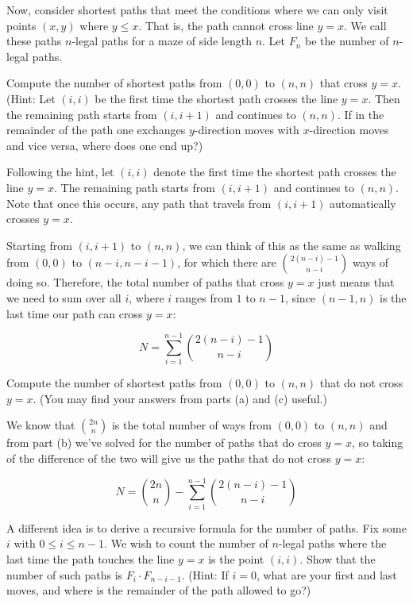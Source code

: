 \documentclass[11pt]{article}
\begin{document}
Now, consider shortest paths that meet the conditions where we can only visit points $(x, y)$ where $y \leq x$. That is, the path cannot cross
line $y = x$. We call these paths $n$-legal paths for a maze of side length $n$. Let $F_n$ be the number of $n$-legal paths.
\begin{ResumeParts}
\Part Compute the number of shortest paths from $(0, 0)$ to $(n, n)$ that cross $y = x$. (Hint: Let $(i, i)$ be the first time the shortest path crosses the line $y = x$. Then the remaining path starts from $(i,i+1)$ and continues to $(n,n)$. If in the remainder of the path 
one exchanges $y$-direction moves with $x$-direction moves and
vice versa, where does one end up?)

\begin{solution}
  Following the hint, let $(i, i)$ denote the first time the shortest path crosses the line $y = x$. The remaining path starts from $(i, i+1)$ and continues to $(n,n)$. Note that once this occurs, any path that travels from $(i, i+1)$ automatically crosses $y = x$. 

  Starting from $(i, i+1)$ to $(n, n)$, we can think of this as the same as walking from $(0, 0)$ to $(n - i, n - i - 1)$, for which there are ${2(n-i) - 1 \choose {n - i}}$ ways of doing so. Therefore, the total number of paths that cross $y = x$ just means that we need to sum over all $i$, where $i$ ranges from $1$ to $n - 1$, since $(n -1, n)$ is the last time our path can cross $y =x$: 

  \[ N = \sum_{i = 1}^{n - 1} {2 (n -i) - 1 \choose {n - i}}\]
\end{solution}

\Part Compute the number of shortest paths from $(0, 0)$ to $(n, n)$ that do not cross $y = x$. (You may find your answers from parts (a) and (c) useful.)

\begin{solution}
  We know that $2n \choose n$ is the total number of ways from $(0, 0)$ to $(n, n)$ and from part (b) we've solved for the number of paths that do cross $y = x$, so taking of the difference of the two will give us the paths that do not cross $y = x$: 

  \[ N = {2n \choose n} - \sum_{i = 1}^{n - 1} {2 (n -i) - 1 \choose {n - i}}\]
\end{solution}

\Part A different idea is to derive a recursive formula for the number of paths. Fix some $i$ with $0 \leq i \leq n - 1$. We wish to count the number of $n$-legal paths where the last time the path touches the line $y = x$ is the point $(i, i)$. Show that the number of such paths is $F_i \cdot F_{n-i-1}$. (Hint: If $i=0$, what are your first and last moves, and where is the remainder of the path allowed to go?)


\end{ResumeParts}
\end{document}
